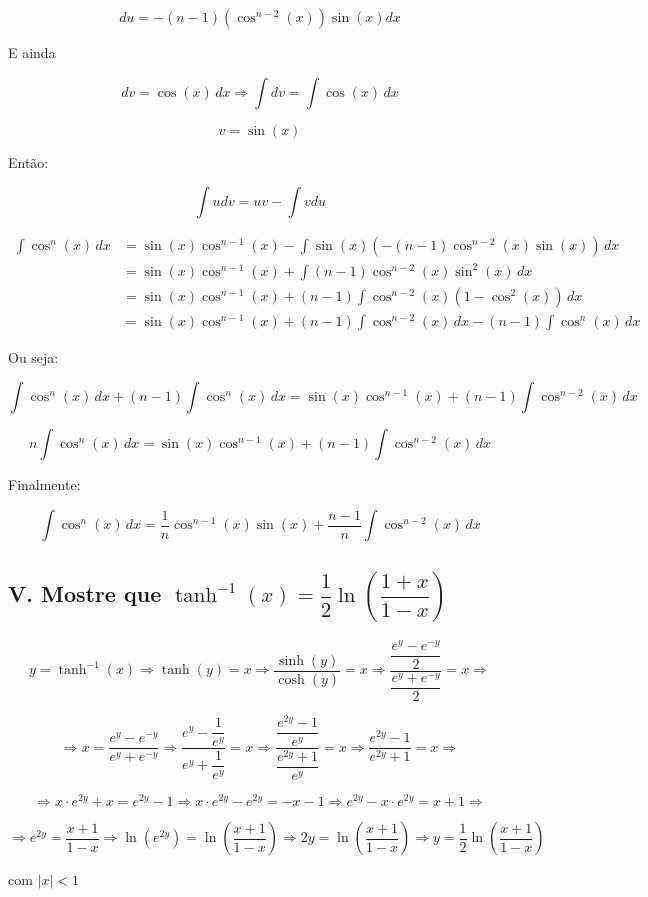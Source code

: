 \documentclass{article}
\begin{document}
\[
    du =   -(n-1) (\cos^{n-2}(x)) \sin(x) dx
\]

E ainda

\[
    dv = \cos(x) \, dx \Rightarrow \int dv = \int \cos(x) \, dx
\]

\[
    v = \sin(x)
\]

Então:

\[
    \int udv = uv - \int vdu
\]

\begin{align*}
    \int \cos^n(x) \, dx
     & =
    \sin(x) \cos^{n-1}(x) - \int \sin(x) (-(n-1)\cos^{n-2}(x)\sin(x)) \, dx
    \\
     & =
    \sin(x) \cos^{n-1}(x) + \int (n-1)\cos^{n-2}(x)\sin^2(x)  \, dx
    \\
     & =
    \sin(x) \cos^{n-1}(x) + (n-1) \int \cos^{n-2}(x) (1 - \cos^2(x)) \, dx
    \\
     & =
    \sin(x) \cos^{n-1}(x)
    + (n-1) \int \cos^{n-2}(x) \, dx
    - (n-1) \int \cos^n(x) \, dx
\end{align*}

Ou seja:

\[
    \int \cos^n(x) \, dx + (n-1) \int \cos^n(x) \, dx
    =
    \sin(x) \cos^{n-1}(x)
    + (n-1) \int \cos^{n-2}(x) \, dx
\]

\[
    n \int \cos^n(x) \, dx
    =
    \sin(x) \cos^{n-1}(x)
    + (n-1) \int \cos^{n-2}(x) \, dx
\]

Finalmente:

\[
    \int \cos^n(x) \, dx
    = \dfrac{1}{n} \cos^{n-1}(x) \sin(x) + \dfrac{n-1}{n} \int \cos^{n-2}(x) \, dx
\]

\subsection*{V. Mostre que \(\tanh^{-1}(x) = \dfrac{1}{2}\ln\left(\dfrac{1+x}{1-x} \right) \)}

\[
    y = \tanh^{-1}(x)
    \Rightarrow \tanh(y) = x
    \Rightarrow \dfrac{\sinh(y)}{\cosh(y)} = x
    \Rightarrow \dfrac{\dfrac{e^y-e^{-y}}{2}}{\dfrac{e^y+e^{-y}}{2}} = x
    \Rightarrow
\]

\[
    \Rightarrow x = \dfrac{e^y-e^{-y}}{e^y+e^{-y}}
    \Rightarrow \dfrac{e^y-\dfrac{1}{e^y}}{e^y+\dfrac{1}{e^y}} = x
    \Rightarrow \dfrac{\dfrac{e^{2y}-1}{e^y}}{\dfrac{e^{2y}+1}{e^y}} = x
    \Rightarrow \dfrac{e^{2y}-1}{e^{2y}+1} = x
    \Rightarrow
\]

\[
    \Rightarrow x \cdot e^{2y} + x = e^{2y} - 1
    \Rightarrow x \cdot e^{2y} - e^{2y} = -x - 1
    \Rightarrow e^{2y} - x \cdot e^{2y} = x + 1
    \Rightarrow
\]

\[
    \Rightarrow e^{2y} = \dfrac{x+1}{1-x}
    \Rightarrow \ln(e^{2y}) = \ln\left(\dfrac{x+1}{1-x} \right)
    \Rightarrow 2y = \ln\left(\dfrac{x+1}{1-x} \right)
    \Rightarrow y = \dfrac{1}{2} \ln\left(\dfrac{x+1}{1-x} \right)
\]

com \(|x|<1\)
\end{document}
